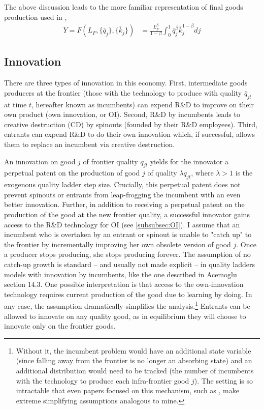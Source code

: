 \documentclass[11pt,english]{article}
\theoremstyle{remark}
\begin{document}
The above discussion leads to the more familiar representation of final goods production used in  \cite{acemoglu_introduction_2009},
\begin{align}
	Y = F(L_F,\{\bar{q}_j\},\{\bar{k}_j\}) &= \frac{L_F^{\beta}}{1-\beta} \int_0^1 \bar{q}_j^{\beta} \bar{k}_j^{1-\beta} dj  \label{eq_final_goods_production}
\end{align}

\subsection{Innovation}\label{subsec:innovation}

There are three types of innovation in this economy. First, intermediate goods producers at the frontier (those with the technology to produce with quality $\bar{q}_{jt}$ at time $t$, hereafter known as incumbents) can expend R\&D to improve on their own product (own innovation, or OI). Second, R\&D by incumbents leads to creative destruction (CD) by spinouts (founded by their R\&D employees). Third, entrants can expend R\&D to do their own innovation which, if successful, allows them to replace an incumbent via creative destruction.

An innovation on good $j$ of frontier quality $\bar{q}_{jt}$ yields for the innovator a perpetual patent on the production of good $j$ of quality $\lambda q_{jt}$, where $\lambda > 1$ is the exogenous quality ladder step size. Crucially, this perpetual patent does not prevent spinouts or entrants from leap-frogging the incumbent with an even better innovation. Further, in addition to receiving a perpetual patent on the production of the good at the new frontier quality, a successful innovator gains access to the R\&D technology for OI (see \ref{subsubsec:OI}).
%
I assume that an incumbent who is overtaken by an entrant or spinout is unable to "catch up" to the frontier by incrementally improving her own obsolete version of good $j$. Once a producer stops producing, she stops producing forever. The assumption of no catch-up growth is standard -- and usually not made explicit -- in quality ladders models with innovation by incumbents, like the one described in Acemoglu section 14.3. One possible interpretation is that access to the own-innovation technology requires current production of the good due to learning by doing. In any case, the assumption dramatically simplifies the analysis.\footnote{Without it, the incumbent problem would have an additional state variable (since falling away from the frontier is no longer an absorbing state) and an additional distribution would need to be tracked (the number of incumbents with the technology to produce each infra-frontier good $j$). The setting is so intractable that even papers focused on this mechanism, such as \cite{aghion_competition_2005}, make extreme simplifying assumptions analogous to mine.} Entrants can be allowed to innovate on any quality good, as in equilibrium they will choose to innovate only on the frontier goods.
\end{document}
